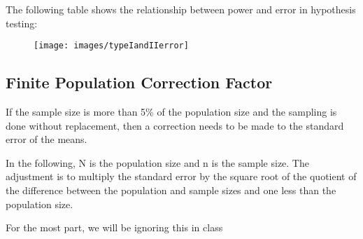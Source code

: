 The following table shows the relationship between power and error in hypothesis testing:

\newpage
\begin{figure}[h!]
\centering
\texttt{[image: images/typeIandIIerror]}
\end{figure}






\subsection{Finite Population Correction Factor}

If the sample size is more than 5\% of the population size and the sampling is done without replacement, then a correction needs to be made to the standard error of the means.

In the following, N is the population size and n is the sample size. The adjustment is to multiply the standard error by the square root of the quotient of the difference between the population and sample sizes and one less than the population size.  

For the most part, we will be ignoring this in class









